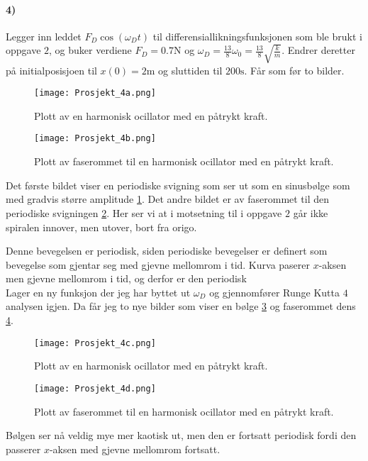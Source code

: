 \documentclass[11pt, A4paper,norsk]{article}
\begin{document}
		\paragraph{4)}
			\begin{flushleft}
Legger inn leddet $F_D \cos(\omega_D t)$ til differensiallikningsfunksjonen som ble brukt i oppgave $2$, og buker verdiene $F_D = 0.7 \text{N}$ og $\omega_D = \frac{13}{8} \omega_0 = \frac{13}{8} \sqrt{\frac{k}{m}}$. Endrer deretter på initialposisjoen til $x(0) = 2 \text{m}$ og sluttiden til $200 \text{s}$. Får som før to bilder.
			\end{flushleft}
			\begin{figure}[H]
\texttt{[image: Prosjekt\_4a.png]}
\caption{Plott av en harmonisk ocillator med en påtrykt kraft.}
\label{4a}
			\end{figure}
			\begin{figure}[H]
\texttt{[image: Prosjekt\_4b.png]}
\caption{Plott av faserommet til en harmonisk ocillator med en påtrykt kraft.}
\label{4b}
			\end{figure}
			\begin{flushleft}
Det første bildet viser en periodiske svigning som ser ut som en sinusbølge som med gradvis større amplitude \ref{4a}. Det andre bildet er av faserommet til den periodiske svigningen \ref{4b}. Her ser vi at i motsetning til i oppgave $2$ går ikke spiralen innover, men utover, bort fra origo.

Denne bevegelsen er periodisk, siden periodiske bevegelser er definert som bevegelse som gjentar seg med gjevne mellomrom i tid. Kurva paserer $x$-aksen men gjevne mellomrom i tid, og derfor er den periodisk \\

Lager en ny funksjon der jeg har byttet ut $\omega_D$ og gjennomfører Runge Kutta $4$ analysen igjen. Da får jeg to nye bilder som viser en bølge \ref{4c} og faserommet dens \ref{4d}.
			\end{flushleft}
			\begin{figure}[H]
\texttt{[image: Prosjekt\_4c.png]}
\caption{Plott av en harmonisk ocillator med en påtrykt kraft.}
\label{4c}
			\end{figure}
			\begin{figure}[H]
\texttt{[image: Prosjekt\_4d.png]}
\caption{Plott av faserommet til en harmonisk ocillator med en påtrykt kraft.}
\label{4d}
			\end{figure}
			\begin{flushleft}
Bølgen ser nå veldig mye mer kaotisk ut, men den er fortsatt periodisk fordi den passerer $x$-aksen med gjevne mellomrom fortsatt.
			\end{flushleft}
\end{document}

